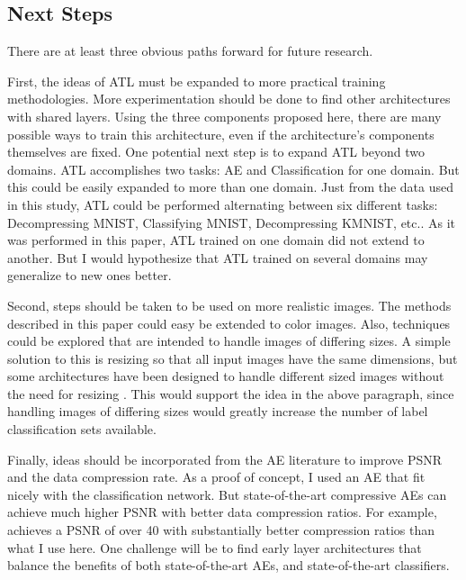 \documentclass[twoside,11pt]{article}
\begin{document}
\subsection{Next Steps}

There are at least three obvious paths forward for future research.

First, the ideas of ATL must be expanded to more practical training methodologies. 
More experimentation should be done to find other architectures with shared layers.
Using the three components proposed here, there are many possible 
ways to train this architecture, even if the architecture's components themselves are fixed.
One potential next step is to expand ATL beyond two domains. ATL accomplishes two tasks:
AE and Classification for one domain. But this could be easily expanded to more than one domain. 
Just from the data used in this study, ATL could be performed alternating between six different 
tasks: Decompressing MNIST, Classifying MNIST, Decompressing KMNIST, etc..
As it was performed in this paper, ATL trained on one domain did not extend to another.
But I would hypothesize that ATL trained on several domains may generalize to new ones better.  

Second, steps should be taken to be used on more realistic images. The methods described
in this paper could easy be extended to color images. Also, techniques could be explored that
are intended to handle images of differing sizes. A simple solution to this is resizing
so that all input images have the same dimensions,
but some architectures have been designed to handle different sized images
without the need for resizing \citep{Iandola2016ExploringTD}.
This would support the idea in the above paragraph, since handling images of differing sizes
would greatly increase the number of label classification sets available.


Finally, ideas should be incorporated from the AE literature to improve PSNR and the 
data compression rate. 
As a proof of concept, I used an AE that fit nicely with the classification network.
But state-of-the-art compressive AEs can achieve much higher PSNR with better data
compression ratios. For example, \citet{theis2017} achieves a PSNR of over 40 with 
substantially better compression ratios than what I use here. 
One challenge will be to find early layer architectures that balance the benefits
of both state-of-the-art
AEs, and state-of-the-art classifiers.  



\end{document}
